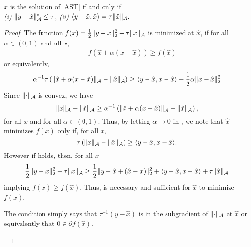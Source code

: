\begin{lemma}
\label{lem:optimality-conditions}
$\hat{x}$ is the solution of \eqref{AST} if and only if\\
\emph{(i)}  $\lVert y - \hat{x}\rVert_{\mathcal{A}}^* \leq \tau$,
\emph{(ii)} $\langle y - \hat{x}, \hat{x}\rangle = \tau \lVert\hat{x}\rVert_{\mathcal{A}}.$
\end{lemma}
\begin{proof}
The function $f(x) = \tfrac{1}{2}\lVert y - x\rVert_2^2 + \tau\lVert x\rVert_{\mathcal{A}}$ is minimized at $\hat{x}$, if for all $\alpha \in (0,1)$ and all $x$,
\begin{eqnarray}
&& f(\hat{x} + \alpha(x - \hat{x})) \geq f(\hat{x})\nonumber
\end{eqnarray}
or equivalently,
\begin{eqnarray}
 \alpha^{-1} \tau \left(\lVert\hat{x} + \alpha(x - \hat{x})\rVert_{\mathcal{A}} - \lVert\hat{x}\rVert_{\mathcal{A}}  \right) \geq \langle y - \hat{x}, x - \hat{x}\rangle - \frac{1}{2}\alpha \lVert x - \hat{x}\rVert_2^2\label{eq:limit}
\end{eqnarray}
Since $\lVert\cdot\rVert_{\mathcal{A}}$ is convex, we have
\[
\lVert x\rVert_{\mathcal{A}} - \lVert\hat{x}\rVert_{\mathcal{A}} \geq \alpha^{-1}  \left(\lVert\hat{x} + \alpha(x - \hat{x})\rVert_{\mathcal{A}} - \lVert\hat{x}\rVert_{\mathcal{A}} \right),
\]
for all $x$ and for all $\alpha \in (0,1)$. Thus, by letting $\alpha \to 0$ in , we note that $\hat{x}$ minimizes $f(x)$ only if, for all $x$,
\begin{equation}
\tau \left( \lVert x\rVert_{\mathcal{A}} - \lVert\hat{x}\rVert_{\mathcal{A}} \right) \geq \langle y - \hat{x}, x - \hat{x}\rangle.\label{eq:subgradient}
\end{equation}
However if  holds, then, for all $x$
\begin{align*}
\frac{1}{2}\| y - x \|_2^2 + \tau \lVert x\rVert_{\mathcal{A}}
\geq \frac{1}{2}\| y - \hat{x} + (\hat{x} - x) \|_2^2 + \langle y - \hat{x}, x - \hat{x}\rangle + \tau \lVert\hat{x}\rVert_{\mathcal{A}}
 \end{align*}
implying $f(x) \geq f(\hat{x}).$
Thus,  is necessary and sufficient for $\hat{x}$ to minimize $f(x)$. 
\begin{note}
The condition  simply says that $\tau^{-1} \left(y - \hat{x} \right)$ is in the subgradient of $\lVert\cdot\rVert_{\mathcal{A}}$ at $\hat{x}$ or equivalently that $0 \in \partial f(\hat{x})$.
\end{note}


\end{proof}
